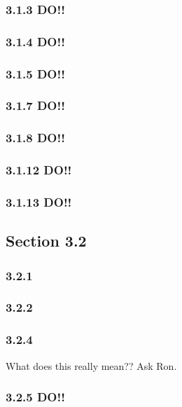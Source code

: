 \documentclass[12pt]{article}
\begin{document}
\subsubsection{3.1.3 DO!!}

\subsubsection{3.1.4 DO!!}

\subsubsection{3.1.5 DO!!}


\subsubsection{3.1.7 DO!!}


\subsubsection{3.1.8 DO!!}

\subsubsection{3.1.12 DO!!}

\subsubsection{3.1.13 DO!!}

\subsection{Section 3.2}

\subsubsection{3.2.1} 
 
\subsubsection{3.2.2}

\subsubsection{3.2.4}
What does this really mean?? Ask Ron.

\subsubsection{3.2.5 DO!!}
\end{document}
